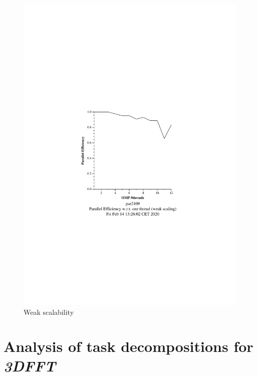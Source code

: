 \begin{figure}%
    \caption{Weak scalability}%
    \label{fig:weak}
    \centering
    \includegraphics[width=\textwidth]{./data/pi/pi_omp-100000000-1-12-3-weak-boada-3.pdf}
\end{figure}

\section{Analysis of task decompositions for \emph{3DFFT}}%
\label{sec:analysis_of_task_decompositions_for_3dfft}


